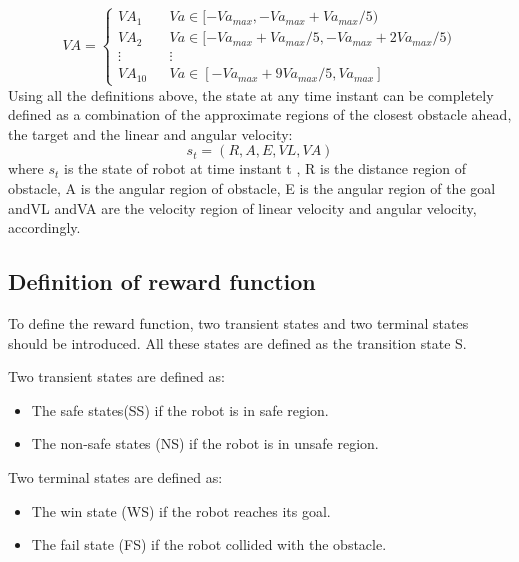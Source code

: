 \documentclass{acmtog} %
\begin{document}
	\begin{equation}
	VA=\left\{
	\begin{array}{rcl}
	VA_1 & & {Va \in [-Va_{max},-Va_{max}+Va_{max}/5)}\\
	VA_2 & & {Va \in [-Va_{max}+Va_{max}/5,-Va_{max}+2Va_{max}/5)}\\
	\vdots & & {\vdots}\\
	VA_{10} & & {Va \in [-Va_{max}+9Va_{max}/5,Va_{max}]}
	\end{array} \right.
	\end{equation}
	Using all the definitions above, the state at any time instant
	can be completely defined as a combination of the approximate regions of the closest obstacle ahead,
	the target and the linear and angular velocity: $$s_t = (R,A,E,VL,VA)$$ where $s_t$ is the state of robot at time instant t , R is the distance region of obstacle, A is the angular region of obstacle, E is the angular region of the goal andVL andVA are the velocity region of linear
	velocity and angular velocity, accordingly.
	
	\subsection{Definition of reward function}
	To define the reward function, two transient states and two terminal states
	should be introduced. All these states are defined as the transition state S.
	
	Two transient states are defined as:
	\begin{itemize}
		\item The safe states(SS) if the robot is in safe region.
		\item The non-safe states (NS) if the robot is in unsafe region.
	\end{itemize}

	Two terminal states are defined as:
	\begin{itemize}
		\item The win state (WS) if the robot reaches its goal.
		\item The fail state (FS) if the robot collided with the obstacle. 
	\end{itemize}
\end{document}
